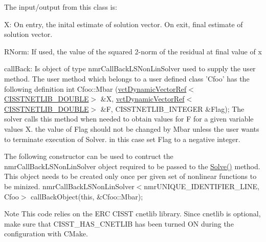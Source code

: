 The input/output from this class is\-:
\begin{DoxyItemize}
\item X\-: On entry, the inital estimate of solution vector. On exit, final estimate of solution vector.
\item R\-Norm\-: If used, the value of the squared 2-\/norm of the residual at final value of x
\item call\-Back\-: Is object of type nmr\-Call\-Back\-L\-S\-Non\-Lin\-Solver used to supply the user method. The user method which belongs to a user defined class 'Cfoo' has the following definition int Cfoo\-::\-Mbar (\hyperlink{classvct_dynamic_vector_ref}{vct\-Dynamic\-Vector\-Ref$<$\-C\-I\-S\-S\-T\-N\-E\-T\-L\-I\-B\-\_\-\-D\-O\-U\-B\-L\-E$>$} \&X, \hyperlink{classvct_dynamic_vector_ref}{vct\-Dynamic\-Vector\-Ref$<$\-C\-I\-S\-S\-T\-N\-E\-T\-L\-I\-B\-\_\-\-D\-O\-U\-B\-L\-E$>$} \&F, C\-I\-S\-S\-T\-N\-E\-T\-L\-I\-B\-\_\-\-I\-N\-T\-E\-G\-E\-R \&Flag); The solver calls this method when needed to obtain values for F for a given variable values X. the value of Flag should not be changed by Mbar unless the user wants to terminate execution of Solver. in this case set Flag to a negative integer.

The following constructor can be used to contruct the nmr\-Call\-Back\-L\-S\-Non\-Lin\-Solver object required to be passed to the \hyperlink{classnmr_l_s_non_lin_solver_a79af0b924ff834cf31df5e20ae261c59}{Solve()} method. This object needs to be created only once per given set of nonlinear functions to be minized. nmr\-Call\-Back\-L\-S\-Non\-Lin\-Solver$<$nmr\-U\-N\-I\-Q\-U\-E\-\_\-\-I\-D\-E\-N\-T\-I\-F\-I\-E\-R\-\_\-\-L\-I\-N\-E, Cfoo$>$ call\-Back\-Object(this, \&\-Cfoo\-::\-Mbar);
\end{DoxyItemize}

\begin{DoxyNote}{Note}
This code relies on the E\-R\-C C\-I\-S\-S\-T cnetlib library. Since cnetlib is optional, make sure that C\-I\-S\-S\-T\-\_\-\-H\-A\-S\-\_\-\-C\-N\-E\-T\-L\-I\-B has been turned O\-N during the configuration with C\-Make. 
\end{DoxyNote}


